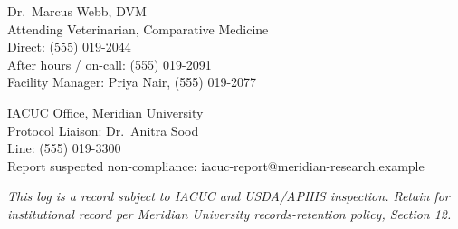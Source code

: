 \documentclass[11pt]{scrreprt}
\begin{document}
\vspace{0.5cm}

\noindent
\begin{minipage}[t]{0.47\textwidth}
\begin{noteslip}[title={\faPhone\ Veterinary Emergency Contact}]
Dr.\ Marcus Webb, DVM \\
Attending Veterinarian, Comparative Medicine \\
Direct: (555) 019-2044 \\
After hours / on-call: (555) 019-2091 \\
Facility Manager: Priya Nair, (555) 019-2077
\end{noteslip}
\end{minipage}\hfill
\begin{minipage}[t]{0.47\textwidth}
\begin{noteslip}[title={\faLock\ IACUC and Compliance}]
IACUC Office, Meridian University \\
Protocol Liaison: Dr.\ Anitra Sood \\
Line: (555) 019-3300 \\
Report suspected non-compliance: iacuc-report@meridian-research.example
\end{noteslip}
\end{minipage}
\par

\vspace{0.8cm}

\begin{center}
\end{center}

\vspace{0.3cm}
\begin{center}
{\small\itshape This log is a record subject to IACUC and USDA/APHIS inspection.
Retain for institutional record per Meridian University records-retention policy,
Section 12.}
\end{center}
\end{document}
